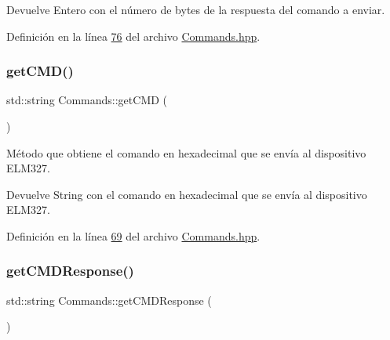 \begin{DoxyReturn}{Devuelve}
Entero con el número de bytes de la respuesta del comando a enviar. 
\end{DoxyReturn}


Definición en la línea \hyperlink{Commands_8hpp_source_l00076}{76} del archivo \hyperlink{Commands_8hpp_source}{Commands.\+hpp}.

\mbox{\label{classCommands_a9aee21ab91fdfc8e9daa59e1e8f20b73}} 
\subsubsection{\texorpdfstring{get\+C\+M\+D()}{getCMD()}}
{\footnotesize\ttfamily std\+::string Commands\+::get\+C\+MD (\begin{DoxyParamCaption}{ }\end{DoxyParamCaption})\hspace{0.3cm}{\ttfamily [inline]}}



Método que obtiene el comando en hexadecimal que se envía al dispositivo E\+L\+M327. 

\begin{DoxyReturn}{Devuelve}
String con el comando en hexadecimal que se envía al dispositivo E\+L\+M327. 
\end{DoxyReturn}


Definición en la línea \hyperlink{Commands_8hpp_source_l00069}{69} del archivo \hyperlink{Commands_8hpp_source}{Commands.\+hpp}.

\mbox{\label{classCommands_ab4806a2fda5c80e10ab4446faa1e39b5}} 
\subsubsection{\texorpdfstring{get\+C\+M\+D\+Response()}{getCMDResponse()}}
{\footnotesize\ttfamily std\+::string Commands\+::get\+C\+M\+D\+Response (\begin{DoxyParamCaption}{ }\end{DoxyParamCaption})\hspace{0.3cm}{\ttfamily [inline]}}



